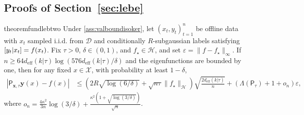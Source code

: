 \documentclass{article}
\let\E\relax
\DeclareMathOperator*{\E}{\mathbb E}
\numberwithin{theorem}{section}
\theoremstyle{definition}
\newcommand{\fwithin}{f_\star}
\newcommand{\inpdist}{\Ds}
\newcommand{\Ds}{\mathcal D}
\newcommand{\Hs}{\mathcal H}
\newcommand{\Xs}{\mathcal X}
\begin{document}
\subsection{Proofs of Section~\ref{sec:lebe}}

\begin{restatable}{theorem}{fundlebtwo}\label{thm:fundlebtwo}
    Under \cref{ass:valboundisoker}, let $(x_t,y_t)_{t=1}^n$ be offline data with $x_t$ sampled i.i.d. from $\inpdist$ and conditionally $R$-subgaussian labels satisfying $\E[y_t|x_t]=f(x_t)$. Fix $\tau>0$, $\delta\in(0,1)$, and $\fwithin\in\Hs$, and set $\varepsilon=\|f-\fwithin\|_\infty$. If $n\ge 64d_\text{eff}(k|\tau)\log(576d_\text{eff}(k|\tau)/\delta)$ and the eigenfunctions are bounded by one, then for any fixed $x\in \Xs$, with probability at least $1-\delta$,
    \begin{align*}
        |\mathsf{P}_{\bm x,\tau}\bm y(x)-f(x)|&\le  \left(2R\sqrt{\log(6/\delta)}+\sqrt{n\tau}\|\fwithin\|_\Hs\right)\sqrt{\frac{ 2d_\text{eff}(k|\tau)}{n}}+\left(\Lambda(\mathsf{P}_{\tau})+1+o_n\right)\varepsilon,
    \end{align*}
    where $o_n=\frac{4\kappa^2}{3n}\log(3/\delta)+\frac{\kappa^2 (1+\sqrt{\log(3/\delta)})}{\sqrt n}$.
\end{restatable}
\end{document}
